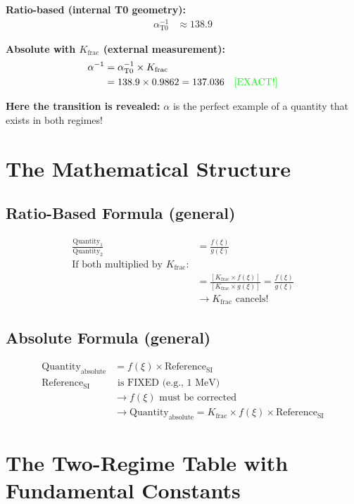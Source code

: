 \documentclass[12pt,a4paper]{article}
\begin{document}
	\textbf{Ratio-based (internal T0 geometry):}
	\begin{align*}
		\alpha_{\text{T0}}^{-1} &\approx 138.9
	\end{align*}
	
	\textbf{Absolute with $K_{\text{frac}}$ (external measurement):}
	\begin{align*}
		\alpha^{-1} &= \alpha_{\text{T0}}^{-1} \times K_{\text{frac}} \\
		&= 138.9 \times 0.9862 = 137.036 \quad \text{\textcolor{green}{[EXACT!]}}
	\end{align*}
	
	\textbf{Here the transition is revealed:} $\alpha$ is the perfect example of a quantity that exists in both regimes!
	
	\section{The Mathematical Structure}
	
	\subsection{Ratio-Based Formula (general)}
	\begin{align*}
		\frac{\text{Quantity}_1}{\text{Quantity}_2} &= \frac{f(\xi)}{g(\xi)} \\
		\text{If both multiplied by $K_{\text{frac}}$:} & \\
		&= \frac{[K_{\text{frac}} \times f(\xi)]}{[K_{\text{frac}} \times g(\xi)]} = \frac{f(\xi)}{g(\xi)} \\
		&\rightarrow K_{\text{frac}} \text{ cancels!}
	\end{align*}
	
	\subsection{Absolute Formula (general)}
	\begin{align*}
		\text{Quantity}_{\text{absolute}} &= f(\xi) \times \text{Reference}_{\text{SI}} \\
		\text{Reference}_{\text{SI}} &\text{ is FIXED (e.g., 1 MeV)} \\
		&\rightarrow f(\xi) \text{ must be corrected} \\
		&\rightarrow \text{Quantity}_{\text{absolute}} = K_{\text{frac}} \times f(\xi) \times \text{Reference}_{\text{SI}}
	\end{align*}
	
	\section{The Two-Regime Table with Fundamental Constants}
	
\end{document}
